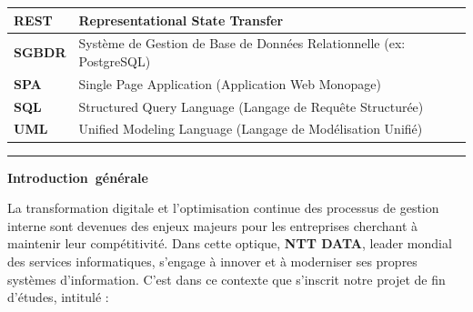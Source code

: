 \documentclass[12pt, a4paper, openany]{report}
\begin{document}
\begin{center}
\begin{tabular}{|>{\centering\arraybackslash}p{}|>{\raggedright\arraybackslash}p{}|}
    \textbf{REST} & Representational State Transfer \\
    \hline
    \textbf{SGBDR} & Système de Gestion de Base de Données Relationnelle (ex: PostgreSQL) \\
    \hline
    \rowcolor{lightBlue}
    \textbf{SPA} & Single Page Application (Application Web Monopage) \\
    \hline
    \textbf{SQL} & Structured Query Language (Langage de Requête Structurée) \\
    \hline
    \rowcolor{lightBlue}
    \textbf{UML} & Unified Modeling Language (Langage de Modélisation Unifié) \\
    \hline
\end{tabular}
\end{center}



\newpage
{} %
\pagestyle{frontmatter} %


{}

\vspace*{0.5cm} 


\noindent
\textcolor{royalBlue}{\rule{0.3\textwidth}{1pt}}
\hfill
\mbox{\fontsize{24}{28}\selectfont\color{royalBlue}\bfseries Introduction générale}

\vspace{1.0cm}

\setlength{\parskip}{0.2cm}
\renewcommand{\baselinestretch}{1.2}\selectfont

La transformation digitale et l'optimisation continue des processus de gestion interne sont devenues des enjeux majeurs pour les entreprises cherchant à maintenir leur compétitivité. Dans cette optique, \textbf{NTT DATA}, leader mondial des services informatiques, s'engage à innover et à moderniser ses propres systèmes d'information. C'est dans ce contexte que s'inscrit notre projet de fin d'études, intitulé : 
\end{document}
